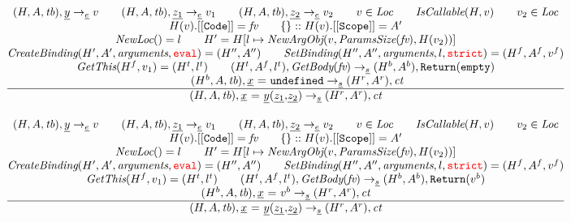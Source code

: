 \[\begin{array}{l@{~~}l@{~~}ll}
\frac{\begin{matrix}
\evale, \ir{y} \rightarrow_{\ir\expr} v
\rulesep
\evale, \ir{z_1} \rightarrow_{\ir\expr} v_1
\rulesep
\evale, \ir{z_2} \rightarrow_{\ir\expr} v_2
\rulesep
v \in \Loc
\rulesep
\hf{IsCallable}(H,v)
\rulesep
v_2 \in \Loc
\\
H(v).{\tt[[Code]]} = \emph{fv}
\rulesep
\{\}::H(v).{\tt[[Scope]]} = A'
\\
\hf{NewLoc}() = l
\rulesep
H' = H[l\mapsto \hf{NewArgObj}(v, \hf{ParamsSize}(\emph{fv}), H(v_2))]
\\
\hf{CreateBinding}(H', A', \hf{arguments}, \eval) = \respp%
\rulesep
\hf{SetBinding}(H'', A'', \hf{arguments}, l, \strict) = (H^f, A^f, v^f)%
\\
\hf{GetThis}(H^f,v_1) = (H^t,l^t)
\rulesep
(H^t, A^f, l^t), \hf{GetBody}(\emph{fv}) \rightarrow_{\ir\stmt} (H^b, A^b), {\tt Return}({\tt empty})
\\
\rulesep
(H^b, A, \tb), \irid\ {\tt =} \ \undef \rightarrow_{\ir\stmt} (H^r,A^r), \ct
\end{matrix}}{\begin{matrix}
\state, \ircall \rightarrow_{\ir\stmt}
(H^r, A^r), \ct
\end{matrix}}
\\[2em]

\frac{\begin{matrix}
\evale, \ir{y} \rightarrow_{\ir\expr} v
\rulesep
\evale, \ir{z_1} \rightarrow_{\ir\expr} v_1
\rulesep
\evale, \ir{z_2} \rightarrow_{\ir\expr} v_2
\rulesep
v \in \Loc
\rulesep
\hf{IsCallable}(H,v)
\rulesep
v_2 \in \Loc
\\
H(v).{\tt[[Code]]} = \emph{fv}
\rulesep
\{\}::H(v).{\tt[[Scope]]} = A'
\\
\hf{NewLoc}() = l
\rulesep
H' = H[l\mapsto \hf{NewArgObj}(v, \hf{ParamsSize}(\emph{fv}), H(v_2))]
\\
\hf{CreateBinding}(H', A', \hf{arguments}, \eval) = \respp%
\rulesep
\hf{SetBinding}(H'', A'', \hf{arguments}, l, \strict) = (H^f, A^f, v^f)%
\\
\hf{GetThis}(H^f,v_1) = (H^t,l^t)
\rulesep
(H^t, A^f, l^t), \hf{GetBody}(\emph{fv}) \rightarrow_{\ir\stmt} (H^b, A^b), {\tt Return}(v^b)
\\
(H^b, A, \tb), \irid\ {\tt =} \ v^b \rightarrow_{\ir\stmt} (H^r,A^r), \ct
\end{matrix}}{\begin{matrix}
\state, \ircall \rightarrow_{\ir\stmt}
(H^r,A^r), \ct
\end{matrix}}
\\[2em]


\end{array}\]

